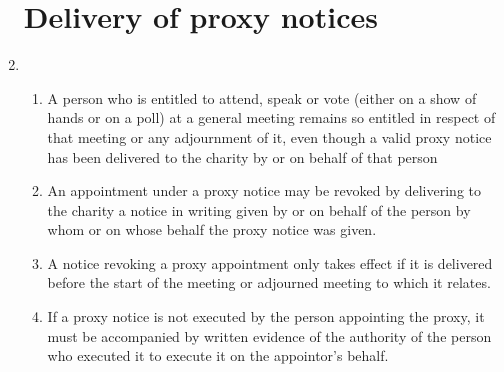 \documentclass{article}
\begin{document}
\begin{enumerate}[label=\arabic*A, start=22]
    \section{Delivery of proxy notices}
    \item \begin{enumerate}[label=(\arabic*)]
        \item A person who is entitled to attend, speak or vote (either on a
        show of hands or on a poll) at a general meeting remains so
        entitled in respect of that meeting or any adjournment of it,
        even though a valid proxy notice has been delivered to the
        charity by or on behalf of that person
        \item An appointment under a proxy notice may be revoked by
        delivering to the charity a notice in writing given by or on behalf
        of the person by whom or on whose behalf the proxy notice
        was given.
        \item A notice revoking a proxy appointment only takes effect if it is
        delivered before the start of the meeting or adjourned meeting
        to which it relates.
        \item If a proxy notice is not executed by the person appointing the
        proxy, it must be accompanied by written evidence of the
        authority of the person who executed it to execute it on the
        appointor's behalf.
    \end{enumerate}
\end{enumerate}
\end{document}
